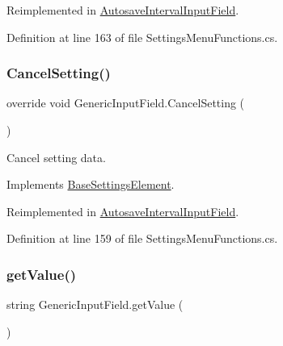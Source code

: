 Reimplemented in \hyperlink{class_autosave_interval_input_field_aa1c438429994349876cc778f3280a01c}{Autosave\+Interval\+Input\+Field}.



Definition at line 163 of file Settings\+Menu\+Functions.\+cs.

\mbox{\label{class_generic_input_field_ae3195906f6ed8b00182ba832e43981f6}} 
\subsubsection{\texorpdfstring{Cancel\+Setting()}{CancelSetting()}}
{\footnotesize\ttfamily override void Generic\+Input\+Field.\+Cancel\+Setting (\begin{DoxyParamCaption}{ }\end{DoxyParamCaption})\hspace{0.3cm}{\ttfamily [virtual]}}



Cancel setting data. 



Implements \hyperlink{class_base_settings_element_a66f796e4aaa1e660a7db3e69547412d3}{Base\+Settings\+Element}.



Reimplemented in \hyperlink{class_autosave_interval_input_field_a6c8ac107fc15d34c30e2a8f3709d2a5d}{Autosave\+Interval\+Input\+Field}.



Definition at line 159 of file Settings\+Menu\+Functions.\+cs.

\mbox{\label{class_generic_input_field_acc277b488cc9420e6828735fff6150d1}} 
\subsubsection{\texorpdfstring{get\+Value()}{getValue()}}
{\footnotesize\ttfamily string Generic\+Input\+Field.\+get\+Value (\begin{DoxyParamCaption}{ }\end{DoxyParamCaption})}



